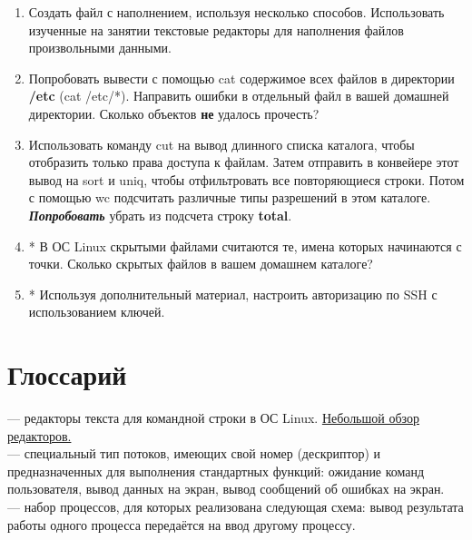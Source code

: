 \documentclass[14pt, a4paper]{article}
\begin{document}
\begin{enumerate}
    \item Создать файл с наполнением, используя несколько способов. Использовать изученные на
    занятии текстовые редакторы для наполнения файлов произвольными данными.
    \item Попробовать вывести с помощью cat содержимое всех файлов в директории \textbf{/etc} (cat /etc/*).
    Направить ошибки в отдельный файл в вашей домашней директории. Сколько объектов \textbf{не}
    удалось прочесть?
    \item Использовать команду cut на вывод длинного списка каталога, чтобы отобразить только права
    доступа к файлам. Затем отправить в конвейере этот вывод на sort и uniq, чтобы
    отфильтровать все повторяющиеся строки. Потом с помощью wc подсчитать различные типы
    разрешений в этом каталоге. \textbf{\textit{Попробовать}} убрать из подсчета строку \textbf{total}.
    \item * В ОС Linux скрытыми файлами считаются те, имена которых начинаются с точки. Сколько
    скрытых файлов в вашем домашнем каталоге?
    \item * Используя дополнительный материал, настроить авторизацию по SSH с использованием
    ключей.
\end{enumerate}

\section*{Глоссарий} 

 — редакторы текста для командной строки в ОС Linux.
\href{https://losst.ru/luchshie-tekstovye-redaktory-linux}{Небольшой обзор редакторов.}\\

\noindent \href{https://ru.wikipedia.org/wiki/Стандартные_потоки}{} — специальный тип потоков, имеющих свой номер (дескриптор) и
предназначенных для выполнения стандартных функций: ожидание команд пользователя, вывод
данных на экран, вывод сообщений об ошибках на экран.\\

\noindent \href{https://ru.wikipedia.org/wiki/Конвейер_(Unix)}{} — набор процессов, для которых реализована следующая схема: вывод
результата работы одного процесса передаётся на ввод другому процессу.\\
\end{document}
